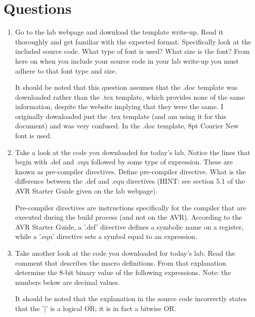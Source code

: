\documentclass[12pt,letterpaper]{article}
\begin{document}
\section{Questions}
\begin{enumerate}

    \item Go to the lab webpage and download the template write-up. Read it
        thoroughly and get familiar with the expected format.  Specifically
        look at the included source code. What type of font is used? What size
        is the font? From here on when you include your source code in your lab
        write-up you must adhere to that font type and size.

            It should be noted that this question assumes that the .doc
            template was downloaded rather than the .tex template, which
            provides none of the same information, despite the website implying
            that they were the same.  I originally downloaded just the .tex
            template (and am using it for this document) and was very confused.
            In the .doc template, 8pt Courier New font is used.

    \item Take a look at the code you downloaded for today’s lab. Notice the
        lines that begin with .def and .equ followed by some type of
        expression. These are known as pre-compiler directives. Define
        pre-compiler directive. What is the difference between the .def and
        .equ directives (HINT: see section 5.1 of the AVR Starter Guide given
        on the lab webpage).

            Pre-compiler directives are instructions specifically for the
            compiler that are executed during the build process (and not on the
            AVR).  According to the AVR Starter Guide, a '.def' directive
            defines a symbolic name on a register, while a '.equ' directive
            sets a symbol equal to an expression.

    \item Take another look at the code you downloaded for today’s lab. Read
        the comment that describes the macro definitions. From that explanation
        determine the 8-bit binary value of the following expressions. Note:
        the numbers below are decimal values.

            It should be noted that the explanation in the source code
            incorrectly states that the '$|$' is a logical OR; it is in fact a
            bitwise OR.


\end{enumerate}
\end{document}
